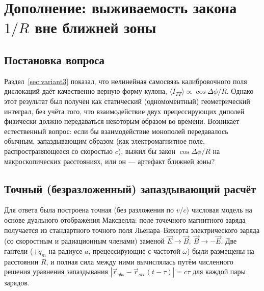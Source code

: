 \documentclass[12pt,a4paper]{article}
\begin{document}

\section{Дополнение: выживаемость закона $1/R$ вне ближней зоны}
\label{sec:retarded-check}

\subsection{Постановка вопроса}

Раздел~\ref{sec:variant3} показал, что нелинейная самосвязь калибровочного
поля дислокаций даёт качественно верную форму кулона,
$\langle I_{TT}\rangle\propto\cos\Delta\phi/R$. Однако этот результат был
получен как статический (одномоментный) геометрический интеграл,
без учёта того, что взаимодействие двух прецессирующих диполей физически
должно передаваться некоторым образом во времени. Возникает естественный
вопрос: если бы взаимодействие монополей передавалось обычным,
запаздывающим образом (как электромагнитное поле, распространяющееся со
скоростью $c$), выжил бы закон $\cos\Delta\phi/R$ на макроскопических
расстояниях, или он --- артефакт ближней зоны?

\subsection{Точный (безразложенный) запаздывающий расчёт}

Для ответа была построена точная (без разложения по $v/c$) числовая
модель на основе дуального отображения Максвелла: поле точечного
магнитного заряда получается из стандартного точного
поля Льенара--Вихерта электрического заряда (со скоростным и
радиационным членами) заменой $\vec E\to\vec B,\ \vec B\to-\vec E$.
Две гантели ($\pm q_m$ на радиусе $a$, прецессирующие с частотой
$\omega$) были размещены на расстоянии $R$, и полная сила между ними
вычислялась путём численного решения уравнения запаздывания
$|\vec r_{obs}-\vec r_{src}(t-\tau)|=c\tau$ для каждой пары зарядов.
\end{document}
